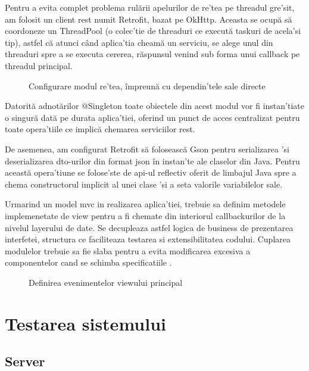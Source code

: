 Pentru a evita complet problema rulării apelurilor de re'tea pe threadul gre'sit, am folosit un client \acrshort{rest} numit Retrofit, bazat pe OkHttp. Aceasta se ocupă să coordoneze un ThreadPool (o colec'tie de threaduri ce execută taskuri de acela'si tip), astfel că atunci când aplica'tia cheamă un serviciu, se alege unul din threaduri spre a se executa cererea, răspunsul venind sub forma unui callback pe threadul principal.

\begin{figure}[H]
  \centering
  \caption{Configurare modul re'tea, împreună cu dependin'tele sale directe}
\end{figure}

Datorită adnotărilor @Singleton toate obiectele din acest modul vor fi instan'tiate o singură dată pe durata aplica'tiei, oferind un punct de acces centralizat pentru toate opera'tiile ce implică chemarea serviciilor \acrshort{rest}.

De asemenea, am configurat Retrofit să folosească Gson pentru serializarea 'si deserializarea \acrshort{dto}-urilor din format \acrshort{json} în instan'te ale claselor din Java. Pentru această opera'tiune se folose'ste de \acrshort{api}-ul reflectiv oferit de limbajul Java spre a chema constructorul implicit al unei clase 'si a seta valorile variabilelor sale.

Urmarind un model \acrshort{mvc} in realizarea aplica'tiei, trebuie sa definim metodele implemenetate de view pentru a fi chemate din interiorul callbackurilor de la nivelul layerului de date. Se decupleaza astfel logica de business de prezentarea interfetei, structura ce faciliteaza testarea si extensibilitatea codului. Cuplarea modulelor trebuie sa fie slaba pentru a evita modificarea excesiva a componentelor cand se schimba specificatiile \cite{sokolova2013android}. 

\begin{figure}[H]
  \centering
  \caption{Definirea evenimentelor viewului principal}
\end{figure}

\section {Testarea sistemului}

\subsection {Server}

